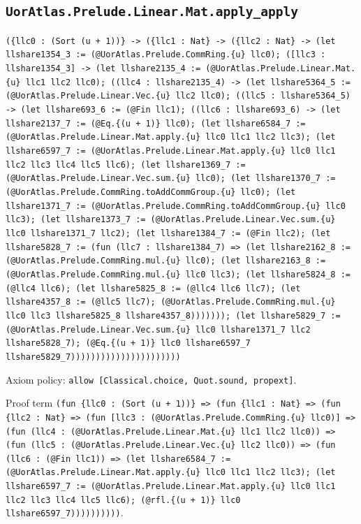 \documentclass[11pt]{article}
\begin{document}
\subsection*{\texttt{UorAtlas.Prelude.Linear.Mat.apply\_apply}}
\noindent\texttt{(\{llc0 : (Sort (u + 1))\} -> (\{llc1 : Nat\} -> (\{llc2 : Nat\} -> (let llshare1354\_3 := (@UorAtlas.Prelude.CommRing.\{u\} llc0); ([llc3 : llshare1354\_3] -> (let llshare2135\_4 := (@UorAtlas.Prelude.Linear.Mat.\{u\} llc1 llc2 llc0); ((llc4 : llshare2135\_4) -> (let llshare5364\_5 := (@UorAtlas.Prelude.Linear.Vec.\{u\} llc2 llc0); ((llc5 : llshare5364\_5) -> (let llshare693\_6 := (@Fin llc1); ((llc6 : llshare693\_6) -> (let llshare2137\_7 := (@Eq.\{(u + 1)\} llc0); (let llshare6584\_7 := (@UorAtlas.Prelude.Linear.Mat.apply.\{u\} llc0 llc1 llc2 llc3); (let llshare6597\_7 := (@UorAtlas.Prelude.Linear.Mat.apply.\{u\} llc0 llc1 llc2 llc3 llc4 llc5 llc6); (let llshare1369\_7 := (@UorAtlas.Prelude.Linear.Vec.sum.\{u\} llc0); (let llshare1370\_7 := (@UorAtlas.Prelude.CommRing.toAddCommGroup.\{u\} llc0); (let llshare1371\_7 := (@UorAtlas.Prelude.CommRing.toAddCommGroup.\{u\} llc0 llc3); (let llshare1373\_7 := (@UorAtlas.Prelude.Linear.Vec.sum.\{u\} llc0 llshare1371\_7 llc2); (let llshare1384\_7 := (@Fin llc2); (let llshare5828\_7 := (fun (llc7 : llshare1384\_7) => (let llshare2162\_8 := (@UorAtlas.Prelude.CommRing.mul.\{u\} llc0); (let llshare2163\_8 := (@UorAtlas.Prelude.CommRing.mul.\{u\} llc0 llc3); (let llshare5824\_8 := (@llc4 llc6); (let llshare5825\_8 := (@llc4 llc6 llc7); (let llshare4357\_8 := (@llc5 llc7); (@UorAtlas.Prelude.CommRing.mul.\{u\} llc0 llc3 llshare5825\_8 llshare4357\_8))))))); (let llshare5829\_7 := (@UorAtlas.Prelude.Linear.Vec.sum.\{u\} llc0 llshare1371\_7 llc2 llshare5828\_7); (@Eq.\{(u + 1)\} llc0 llshare6597\_7 llshare5829\_7))))))))))))))))))))))}\par
\noindent Axiom policy: \texttt{allow [Classical.choice, Quot.sound, propext]}.\par
\noindent Proof term \texttt{(fun \{llc0 : (Sort (u + 1))\} => (fun \{llc1 : Nat\} => (fun \{llc2 : Nat\} => (fun [llc3 : (@UorAtlas.Prelude.CommRing.\{u\} llc0)] => (fun (llc4 : (@UorAtlas.Prelude.Linear.Mat.\{u\} llc1 llc2 llc0)) => (fun (llc5 : (@UorAtlas.Prelude.Linear.Vec.\{u\} llc2 llc0)) => (fun (llc6 : (@Fin llc1)) => (let llshare6584\_7 := (@UorAtlas.Prelude.Linear.Mat.apply.\{u\} llc0 llc1 llc2 llc3); (let llshare6597\_7 := (@UorAtlas.Prelude.Linear.Mat.apply.\{u\} llc0 llc1 llc2 llc3 llc4 llc5 llc6); (@rfl.\{(u + 1)\} llc0 llshare6597\_7))))))))))}.\par
\end{document}
